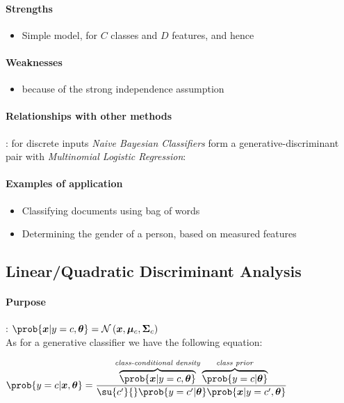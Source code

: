 \paragraph{Strengths}
\begin{itemize}
    \item Simple model, for $C$ classes and $D$ features, and hence 
\end{itemize}

\paragraph{Weaknesses}
\begin{itemize}
    \item {} because of the strong independence assumption
\end{itemize}

\paragraph{Relationships with other methods}
: for discrete inputs 
\emph{Naive Bayesian Classifiers} form a 
generative-discriminant pair with \emph{Multinomial Logistic
Regression}: 

\paragraph{Examples of application}
\begin{itemize}
    \item Classifying documents using bag of words
    \item Determining the gender of a person, based on measured features 
\end{itemize}


\subsection{Linear/Quadratic Discriminant Analysis}
\paragraph{Purpose}
: $\prob{\bm{x}|y=c,\bm{\theta}} = \mathcal{N}
\left(\bm{x}, \bm{\mu}_{c},\bm{\Sigma}_{c}\right)$\\
As for a generative classifier we have the following equation: 
\begin{center}
    $\prob{y=c|\bm{x},\bm{\theta}} = \dfrac{\overbrace{\prob{\bm{x}|y=c,
        \bm{\theta}}}^{\text{\emph{class-conditional density}}}
        \overbrace{\prob{y=c|\bm{\theta}}}^{\text{\emph{class prior}}}}{
    \su{c'}{}\prob{y=c'|\bm{\theta}} \prob{\bm{x}|y=c',\bm{\theta}}}$
\end{center}

